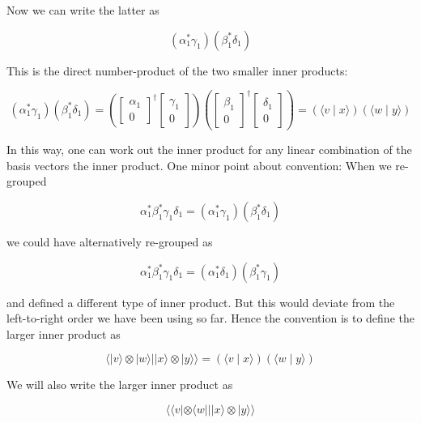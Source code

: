 \documentclass[main.tex]{subfiles}
\begin{document}
    Now we can write the latter as
    
    $$
    \left(\alpha_{1}^{*} \gamma_{1}\right)\left(\beta_{1}^{*} \delta_{1}\right)
    $$
    
    This is the direct number-product of the two smaller inner products:
    
    $$
    \left(\alpha_{1}^{*} \gamma_{1}\right)\left(\beta_{1}^{*} \delta_{1}\right)=\left(\left[\begin{array}{c}
    \alpha_{1} \\
    0
    \end{array}\right]^{\dagger}\left[\begin{array}{c}
    \gamma_{1} \\
    0
    \end{array}\right]\right)\left(\left[\begin{array}{c}
    \beta_{1} \\
    0
    \end{array}\right]^{\dagger}\left[\begin{array}{c}
    \delta_{1} \\
    0
    \end{array}\right]\right)=(\langle v \mid x\rangle)(\langle w \mid y\rangle)
    $$
    
    In this way, one can work out the inner product for any linear combination of the basis vectors the inner product. One minor point about convention: When we re-grouped
    
    $$
    \alpha_{1}^{*} \beta_{1}^{*} \gamma_{1} \delta_{1}=\left(\alpha_{1}^{*} \gamma_{1}\right)\left(\beta_{1}^{*} \delta_{1}\right)
    $$
    
    we could have alternatively re-grouped as
    
    $$
    \alpha_{1}^{*} \beta_{1}^{*} \gamma_{1} \delta_{1}=\left(\alpha_{1}^{*} \delta_{1}\right)\left(\beta_{1}^{*} \gamma_{1}\right)
    $$
    
    and defined a different type of inner product. But this would deviate from the left-to-right order we have been using so far. Hence the convention is to define the larger inner product as
    
    $$
    \langle\mid v\rangle \otimes|w\rangle|| x\rangle \otimes|y\rangle\rangle=(\langle v \mid x\rangle)(\langle w \mid y\rangle)
    $$
    
    We will also write the larger inner product as
    
    $$
    \langle\langle v|\otimes\langle w|| \mid x\rangle \otimes| y\rangle\rangle
    $$
    
\end{document}

